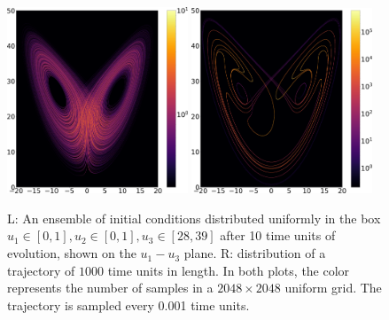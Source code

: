 \begin{figure} \centering
\includegraphics[width=0.48\textwidth]{lorenz_trajectory_1000.0.png}
\hspace{0.02\textwidth}
\includegraphics[width=0.48\textwidth]{lorenz_ensemble_10.png}
\caption{
L: An ensemble of initial conditions distributed uniformly in the box $u_1\in[0,1], u_2\in[0,1], u_3\in[28,39]$ 
after 10 time units of evolution, shown on the $u_1-u_3$ plane.
R: distribution of a trajectory of $1000$ time units in length.
In both plots, the color represents the number of samples in a
$2048\times2048$ uniform grid.  The trajectory is sampled every 0.001 time units.
}
\label{fig:lorenz_ergodicity1}
\end{figure}

